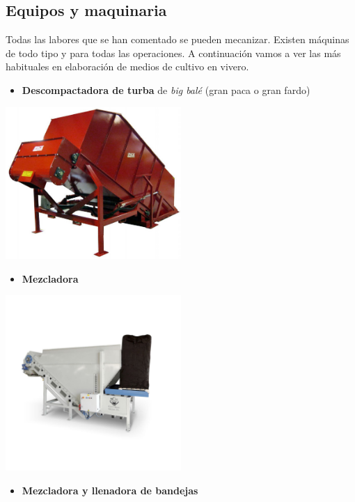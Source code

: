 \documentclass[a4paper,12pt,oneside]{article}
\begin{document}
\subsection{Equipos y maquinaria}
\label{sec:org5b43848}
Todas las labores que se han comentado se pueden mecanizar. Existen máquinas de
todo tipo y para todas las operaciones. A continuación vamos a ver las más
habituales en elaboración de medios de cultivo en vivero.
\begin{itemize}
\item \textbf{Descompactadora de turba} de \emph{big balé} (gran paca o gran fardo)
\end{itemize}
\begin{center}
\includegraphics[width=0.5\textwidth]{./img_uf1596/big_bale.jpg}
\end{center}
\newpage
\begin{itemize}
\item \textbf{Mezcladora}
\end{itemize}
\begin{center}
\includegraphics[width=0.5\textwidth]{./img_uf1596/mezcladora.jpg}
\end{center}
\begin{itemize}
\item \textbf{Mezcladora y llenadora de bandejas}
\end{itemize}
\end{document}

